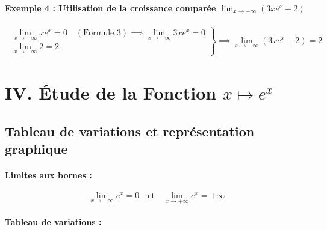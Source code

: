 \documentclass[12pt,a4paper]{article}
\begin{document}
\begin{tcolorbox}[colback=gray!5!white,colframe=myblue,title=\textbf{Exemples d'application}]
\vspace{0.3cm}

\paragraph{Exemple 4 : Utilisation de la croissance comparée $\lim_{x \to -\infty} (3x e^x + 2)$}
\[
\begin{aligned}
\left.
\begin{array}{l}
\lim_{x \to -\infty} x e^x = 0 \quad (\text{Formule 3}) \implies \lim_{x \to -\infty} 3x e^x = 0 \\[2mm]
\lim_{x \to -\infty} 2 = 2
\end{array}
\right\} 
&\implies \lim_{x \to -\infty} (3x e^x + 2) = 2
\end{aligned}
\]

\end{tcolorbox}


\section*{\color{myred}IV. Étude de la Fonction $x \mapsto e^x$}

\subsection*{\color{myred} Tableau de variations et représentation graphique}

\paragraph{Limites aux bornes :}
\[
\lim_{x \to -\infty} e^x = 0 \quad \text{et} \quad \lim_{x \to +\infty} e^x = +\infty
\]

\paragraph{Tableau de variations :}

\begin{center}
\end{center}
\end{document}
